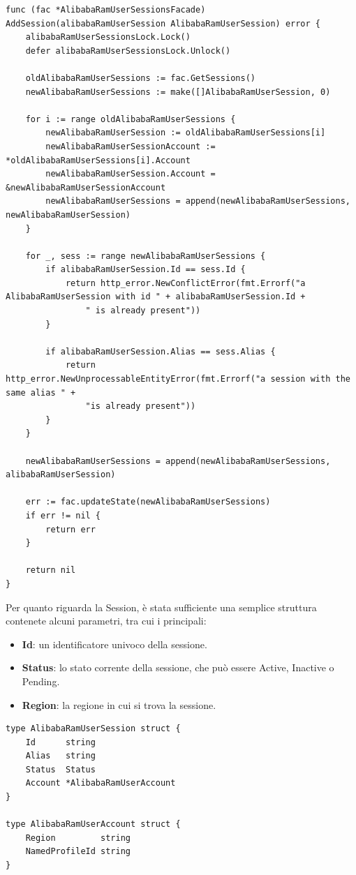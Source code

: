 \documentclass[a4paper]{article}
\begin{document}
\begin{lstlisting}[style=customgo, caption=alibaba\_ram\_user\_session\_facade.go (righe 64-98), captionpos=b, firstnumber=64]
func (fac *AlibabaRamUserSessionsFacade) AddSession(alibabaRamUserSession AlibabaRamUserSession) error {
	alibabaRamUserSessionsLock.Lock()
	defer alibabaRamUserSessionsLock.Unlock()

	oldAlibabaRamUserSessions := fac.GetSessions()
	newAlibabaRamUserSessions := make([]AlibabaRamUserSession, 0)

	for i := range oldAlibabaRamUserSessions {
		newAlibabaRamUserSession := oldAlibabaRamUserSessions[i]
		newAlibabaRamUserSessionAccount := *oldAlibabaRamUserSessions[i].Account
		newAlibabaRamUserSession.Account = &newAlibabaRamUserSessionAccount
		newAlibabaRamUserSessions = append(newAlibabaRamUserSessions, newAlibabaRamUserSession)
	}

	for _, sess := range newAlibabaRamUserSessions {
		if alibabaRamUserSession.Id == sess.Id {
			return http_error.NewConflictError(fmt.Errorf("a AlibabaRamUserSession with id " + alibabaRamUserSession.Id +
				" is already present"))
		}

		if alibabaRamUserSession.Alias == sess.Alias {
			return http_error.NewUnprocessableEntityError(fmt.Errorf("a session with the same alias " +
				"is already present"))
		}
	}

	newAlibabaRamUserSessions = append(newAlibabaRamUserSessions, alibabaRamUserSession)

	err := fac.updateState(newAlibabaRamUserSessions)
	if err != nil {
		return err
	}

	return nil
}
\end{lstlisting}

Per quanto riguarda la Session, è stata sufficiente una semplice struttura contenete alcuni parametri, tra cui i principali:
\begin{itemize}
 \item \textbf{Id}: un identificatore univoco della sessione.
 \item \textbf{Status}: lo stato corrente della sessione, che può essere Active, Inactive o Pending.
 \item \textbf{Region}: la regione in cui si trova la sessione.
\end{itemize}

\begin{lstlisting}[style=customgo, caption=alibaba\_ram\_user\_session.go (righe 9-19), captionpos=b, firstnumber=9]
type AlibabaRamUserSession struct {
	Id      string
	Alias   string
	Status  Status
	Account *AlibabaRamUserAccount
}

type AlibabaRamUserAccount struct {
	Region         string
	NamedProfileId string
}
\end{lstlisting}
\end{document}
